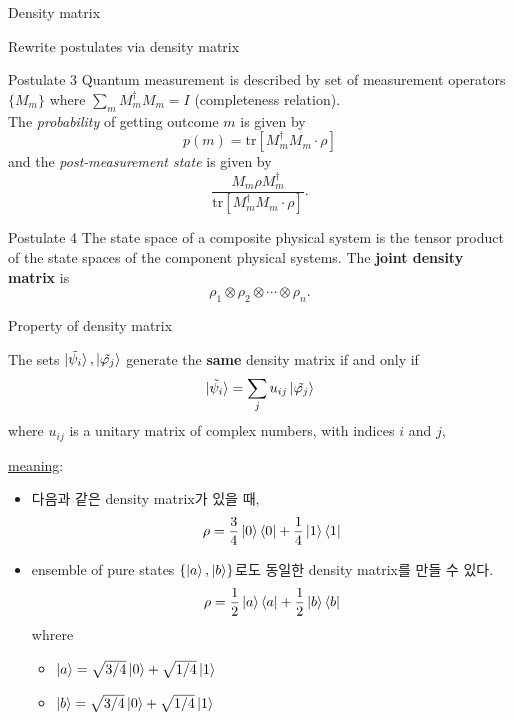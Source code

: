 \documentclass[9pt]{beamer}
\begin{document}
\begin{section}{Density matrix}
        \begin{frame}{Rewrite postulates via density matrix}
            \begin{block}{Postulate 3}
                Quantum measurement is described by set of measurement operators $\{M_m\}$ where $\sum_m M_m^\dagger M_m = I$ (completeness relation). 
                \\ The \textit{probability} of getting outcome $m$ is given by
                $$p(m) = \text{tr}[M^\dagger_m M_m \cdot \rho] $$
                and the \textit{post-measurement state} is given by
                $$\frac{M_m\rho M_m^\dagger}{ {\text{tr}[M^\dagger_m M_m \cdot \rho] }}.$$
            \end{block}
            \begin{block}{Postulate 4}
                The state space of a composite physical system is the tensor product of the state spaces of the component physical systems. The \textbf{joint density matrix} is $${\rho_1} \otimes {\rho_2} \otimes \cdots \otimes {\rho_n}.$$
            \end{block}
        \end{frame}

        \begin{frame}{Property of density matrix}
            \begin{theorem}
                The sets $\ket{\tilde{\psi_i}}, \ket{\tilde{\varphi_j}}$ generate the \textbf{same} density matrix if and only if
                $$\ket{\tilde{\psi_i}} = \sum_j u_{ij} \ket{\tilde{\varphi_j}}$$
                where $u_{ij}$ is a unitary matrix of complex numbers, with indices $i$ and $j$, 
            \end{theorem}
            \checkmark \underline{meaning}:
            \begin{itemize}
                \item 다음과 같은 density matrix가 있을 때, 
                $$\rho = \frac{3}{4} \ket 0 \bra 0 + \frac{1}{4} \ket 1 \bra 1$$
                \item ensemble of pure states $\{\ket a, \ket b\}$로도 동일한 density matrix를 만들 수 있다.
                $$ \rho = \frac{1}{2}\ket{a} \bra a + \frac{1}{2} \ket b \bra b $$
                whrere
                \begin{itemize}
                    \item $\ket a = \sqrt{3/4} \ket 0 + \sqrt{1/4} \ket 1$
                    \item $\ket b = \sqrt{3/4} \ket 0 + \sqrt{1/4} \ket 1$
                \end{itemize}
            \end{itemize}
        \end{frame}


\end{section}
\end{document}
